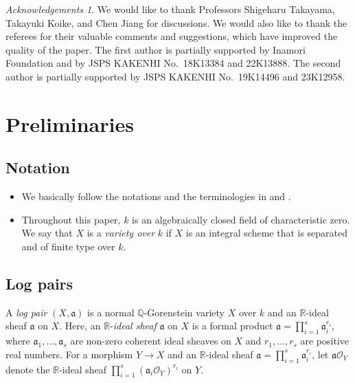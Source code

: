 \documentclass[a4paper,11pt]{amsart}
\theoremstyle{definition}
\theoremstyle{remark}
\newtheorem*{ackn}{Acknowledgements}
\begin{document}
\begin{ackn}
We would like to thank Professors Shigeharu Takayama, Takayuki Koike, and Chen Jiang for discussions. 
We would also like to thank the referees for their valuable comments and suggestions, 
which have improved the quality of the paper.
The first author is partially supported by Inamori Foundation and by JSPS KAKENHI No.\ 18K13384 and 22K13888. 
The second author is partially supported by JSPS KAKENHI No.\ 19K14496 and 23K12958.
\end{ackn}

\section{Preliminaries}\label{section:prelimi}

\subsection{Notation}\label{subsection:notation}

\begin{itemize}
\item 
We basically follow the notations and the terminologies in \cite{Har77} and \cite{Kol13}. 


\item 
Throughout this paper, $k$ is an algebraically closed field of characteristic zero. 
We say that $X$ is a \textit{variety over} $k$ if 
$X$ is an integral scheme that is separated and of finite type over $k$. 
\end{itemize}

\subsection{Log pairs}\label{subsection:LP}
A \textit{log pair} $(X, \mathfrak{a})$ is a normal $\mathbb{Q}$-Gorenstein variety $X$ over $k$ and 
an $\mathbb{R}$-ideal sheaf $\mathfrak{a}$ on $X$. 
Here, an $\mathbb{R}$-\textit{ideal sheaf} $\mathfrak{a}$ on $X$ is a formal product 
$\mathfrak{a} = \prod _{i = 1} ^s \mathfrak{a}_i ^{r_i}$, where $\mathfrak{a}_1, \ldots, \mathfrak{a}_s$ are non-zero coherent ideal sheaves on $X$ and $r_1, \ldots , r_s$ are positive real numbers. 
For a morphism $Y \to X$ and an $\mathbb{R}$-ideal sheaf $\mathfrak{a} = \prod _{i = 1} ^s \mathfrak{a}_i ^{r_i}$, 
let $\mathfrak{a} \mathcal{O}_Y$ denote the $\mathbb{R}$-ideal sheaf $\prod _{i = 1} ^s (\mathfrak{a}_i \mathcal{O}_Y)  ^{r_i}$ on $Y$. 
\end{document}
